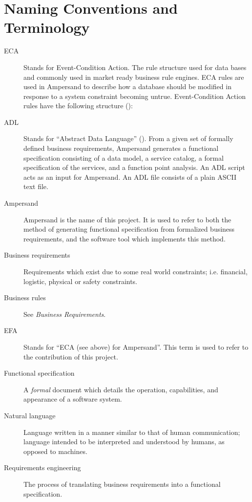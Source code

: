 \documentclass[12pt]{report}
\begin{document}
%

\section{Naming Conventions and Terminology}\label{sec:Naming} 
\begin{description}
\item[ECA] Stands for Event-Condition Action. The rule structure used for data
  bases and commonly used in market ready business rule engines. ECA rules are
  used in Ampersand to describe how a database should be modified in response to
  a system constraint becoming untrue. Event-Condition Action rules have
  the following structure (\cite[8--9]{RBD}):
\item [ADL] Stands for ``Abstract Data Language'' (\cite[13]{derFun}). From a
given set of formally defined business requirements, Ampersand generates a
functional specification consisting of a data model, a service catalog, a
formal specification of the services, and a function point analysis. An ADL
script acts as an input for Ampersand. An ADL file consists of a plain ASCII
text file.
\item [Ampersand] Ampersand is the name of this project. It is used to refer to
both the method of generating functional specification from formalized
business requirements, and the software tool which implements this method.
\item [Business requirements] Requirements which exist due to some real world constraints;
i.e.
financial, logistic, physical or safety constraints. 
\item [Business rules] See \emph{Business Requirements}.
\item [EFA] Stands for ``ECA (see above) for Ampersand''. This term is used to refer to 
  the contribution of this project. 
\item [Functional specification] A \emph{formal} document which details the operation,
  capabilities, and appearance of a software system. 

\item [Natural language] Language written in a manner similar
to that of human communication; 
  language intended to be interpreted and understood by humans, as opposed to machines. 
\item [Requirements engineering] The process of translating business
requirements into a functional specification. 

\end{description}
\end{document}
